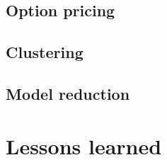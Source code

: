 \documentclass[12pt,a4paper]{article}
\begin{document}
\subsection{Option pricing}
\subsection{Clustering}
\subsection{Model reduction}

\section{Lessons learned}


\end{document}
